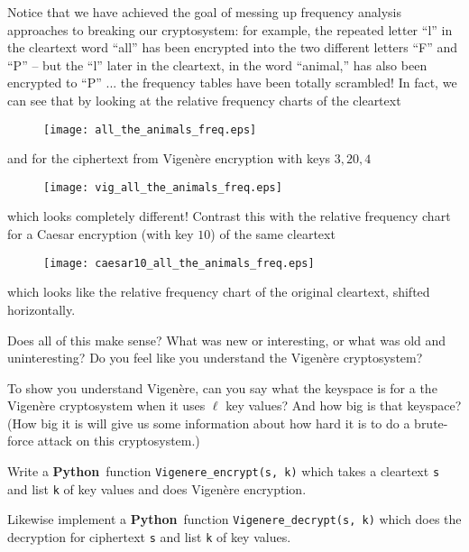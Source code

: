 \documentclass[12pt,letterpaper]{amsbook}
\theoremstyle{definition}
\theoremstyle{remark}
\numberwithin{figure}{section}
\numberwithin{exercise}{chapter}
\numberwithin{section}{chapter}
\numberwithin{equation}{section}
\numberwithin{table}{subsection}
\newcommand{\code}[1]{\colorbox{lg}{\texttt{#1}}}
\newcommand{\Python}{{\textbf{\ix{Python}}}}
\newcommand{\ix}[1]{{#1}\index{#1}}
\begin{document}
Notice that we have achieved the goal of messing up frequency analysis
approaches to breaking our cryptosystem: for example, the repeated letter ``l''
in the cleartext word ``all'' has been encrypted into the two different letters
``F'' and ``P'' -- but the ``l'' later in the cleartext, in the word ``animal,''
has also been encrypted to ``P'' ... the frequency tables have been totally
scrambled!  In fact, we can see that by looking at the relative frequency
charts of the cleartext
\begin{figure}[H]
 \centering
 \texttt{[image: all\_the\_animals\_freq.eps]}
 \label{fig:all_the_animals_freq}
\end{figure}
\vskip-4mm\noindent and for the ciphertext from Vigen\`ere encryption with keys $3, 20, 4$
\begin{figure}[H]
 \centering
 \texttt{[image: vig\_all\_the\_animals\_freq.eps]}
 \label{fig:vig_all_the_animals_freq}
\end{figure}
\vskip-4mm\noindent which looks completely different!  Contrast this with the relative
frequency chart for a Caesar encryption (with key $10$) of the same cleartext
\begin{figure}[H]
 \centering
 \texttt{[image: caesar10\_all\_the\_animals\_freq.eps]}
 \label{fig:caesar10_all_the_animals_freq}
\end{figure}
\vskip-4mm\noindent which looks like the relative frequency chart of the original
cleartext, shifted horizontally.

\vskip5mm
\begin{AZtcb}[label=az:Vigenere]{}{}
  Does all of this make sense?  What was new or interesting, or what was old and uninteresting?  Do you feel like you understand the Vigen\`ere cryptosystem?
\end{AZtcb}

\vskip2mm
\begin{AZtcb}[label=az:Vigenerekeys]{}{}
  To show you understand Vigen\`ere, can you say what the keyspace is for
  a the Vigen\`ere cryptosystem when it uses $\ell$ key values?  And how big
  is that keyspace?  (How big it is will give us some information about how
  hard it is to do a \ix{brute-force attack} on this cryptosystem.)
\end{AZtcb}

\vskip2mm
\begin{CTtcb}[label=ct:Vigenere]{}{}
 Write a \Python\ function \code{Vigenere\_encrypt(s, k)} which takes
 a cleartext \code{s} and list \code{k} of key values and does
 Vigen\`ere encryption.

 Likewise implement a \Python\ function \code{Vigenere\_decrypt(s, k)}
 which does the decryption for ciphertext \code{s} and list \code{k}
 of key values.
\end{CTtcb}
\end{document}

